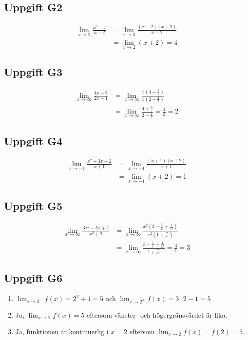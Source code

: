 \documentclass[12pt]{article}
\begin{document}
\subsection*{Uppgift G2}
\begin{align*}
\lim_{x \to 2} \frac{x^2 - 4}{x - 2} &= \lim_{x \to 2} \frac{(x - 2)(x + 2)}{x - 2} \\
&= \lim_{x \to 2} (x + 2) = 4
\end{align*}

\subsection*{Uppgift G3}
\begin{align*}
\lim_{x \to \infty} \frac{4x + 3}{2x - 1} &= \lim_{x \to \infty} \frac{x(4 + \frac{3}{x})}{x(2 - \frac{1}{x})} \\
&= \lim_{x \to \infty} \frac{4 + \frac{3}{x}}{2 - \frac{1}{x}} = \frac{4}{2} = 2
\end{align*}

\subsection*{Uppgift G4}
\begin{align*}
\lim_{x \to -1} \frac{x^2 + 3x + 2}{x + 1} &= \lim_{x \to -1} \frac{(x + 1)(x + 2)}{x + 1} \\
&= \lim_{x \to -1} (x + 2) = 1
\end{align*}

\subsection*{Uppgift G5}
\begin{align*}
\lim_{x \to \infty} \frac{3x^2 - 5x + 1}{x^2 + 2} &= \lim_{x \to \infty} \frac{x^2(3 - \frac{5}{x} + \frac{1}{x^2})}{x^2(1 + \frac{2}{x^2})} \\
&= \lim_{x \to \infty} \frac{3 - \frac{5}{x} + \frac{1}{x^2}}{1 + \frac{2}{x^2}} = \frac{3}{1} = 3
\end{align*}

\subsection*{Uppgift G6}
\begin{enumerate}[label=\alph*)]
    \item $\lim_{x \to 2^-} f(x) = 2^2 + 1 = 5$ och $\lim_{x \to 2^+} f(x) = 3 \cdot 2 - 1 = 5$
    \item Ja, $\lim_{x \to 2} f(x) = 5$ eftersom vänster- och högergränsvärdet är lika.
    \item Ja, funktionen är kontinuerlig i $x = 2$ eftersom $\lim_{x \to 2} f(x) = f(2) = 5$.
\end{enumerate}
\end{document}
